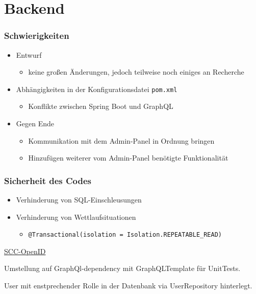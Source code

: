 \section{Backend}

\begin{frame}\frametitle{Schwierigkeiten}
\begin{itemize}
	\item Entwurf
	\begin{itemize}
		\item keine großen Änderungen, jedoch teilweise noch einiges an Recherche
	\end{itemize}
	\item Abhängigkeiten in der Konfigurationsdatei \texttt{pom.xml}
	\begin{itemize}
		\item Konflikte zwischen Spring Boot und GraphQL
	\end{itemize}
	\item Gegen Ende
	\begin{itemize}
		\item Kommunikation mit dem Admin-Panel in Ordnung bringen
		\item Hinzufügen weiterer vom Admin-Panel benötigte Funktionalität
	\end{itemize}
\end{itemize}
\end{frame}

\begin{frame}\frametitle{Sicherheit des Codes}
\begin{itemize}
	\item Verhinderung von SQL-Einschleusungen
	\item Verhinderung von Wettlaufsituationen
	\begin{itemize}
		\item \texttt{@Transactional(isolation = Isolation.REPEATABLE\_READ)}
	\end{itemize}
\end{itemize}
\end{frame}

\begin{frame}%
  \href{https://www.scc.kit.edu/dienste/openid-connect.php}{SCC-OpenID}
\end{frame}

\begin{frame}%
  Umstellung auf GraphQl-dependency mit GraphQLTemplate für UnitTests. 
\end{frame}

\begin{frame}%
  User mit enstprechender Rolle in der Datenbank via UserRepository hinterlegt.
\end{frame}
